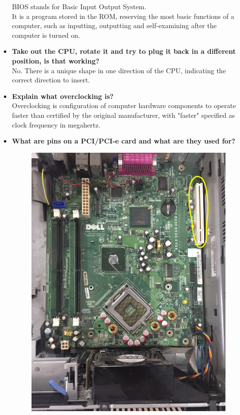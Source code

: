 \documentclass{article}
\begin{document}
\begin{itemize}
	BIOS stands for Basic Input Output System.\\
	It is a program stored in the ROM, reserving the most basic functions of a computer, such as inputting, outputting and self-examining after the computer is turned on.
	\item \textbf{Take out the CPU, rotate it and try to plug it back in a different position, is that working?}\\
	No. There is a unique shape in one direction of the CPU, indicating the correct direction to insert.
	\item \textbf{Explain what overclocking is?}\\
	Overclocking is configuration of computer hardware components to operate faster than certified by the original manufacturer, with "faster" specified as clock frequency in megahertz.
	\item \textbf{What are pins on a PCI/PCI-e card and what are they used for?}\\
	\begin{figure}[h!]
	\begin{center}
	\includegraphics[scale=0.06]{PCI.jpg}

\end{center}
\end{figure}
\end{itemize}
\end{document}
